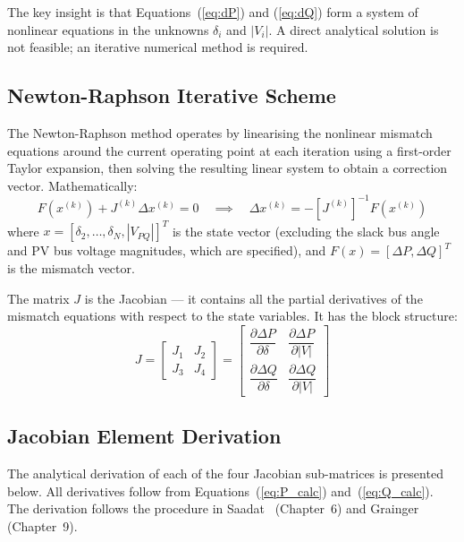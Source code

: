 \documentclass[12pt, a4paper]{article}
\begin{document}
The key insight is that Equations~(\ref{eq:dP}) and (\ref{eq:dQ}) form a system of nonlinear equations in the unknowns $\delta_i$ and $|V_i|$. A direct analytical solution is not feasible; an iterative numerical method is required.

\subsection{Newton-Raphson Iterative Scheme}
The Newton-Raphson method operates by linearising the nonlinear mismatch equations around the current operating point at each iteration using a first-order Taylor expansion, then solving the resulting linear system to obtain a correction vector. Mathematically:
\begin{equation}
F(x^{(k)}) + J^{(k)} \Delta x^{(k)} = 0 \quad \implies \quad \Delta x^{(k)} = -\left[J^{(k)}\right]^{-1} F(x^{(k)})
\label{eq:NR_update}
\end{equation}
where $x = [\delta_2, \ldots, \delta_N, |V_{PQ}|]^T$ is the state vector (excluding the slack bus angle and PV bus voltage magnitudes, which are specified), and $F(x) = [\Delta P, \Delta Q]^T$ is the mismatch vector.

The matrix $J$ is the Jacobian --- it contains all the partial derivatives of the mismatch equations with respect to the state variables. It has the block structure:
\begin{equation}
J = \begin{bmatrix}
J_1 & J_2 \\
J_3 & J_4
\end{bmatrix}
= \begin{bmatrix}
\dfrac{\partial \Delta P}{\partial \delta} & \dfrac{\partial \Delta P}{\partial |V|} \\[8pt]
\dfrac{\partial \Delta Q}{\partial \delta} & \dfrac{\partial \Delta Q}{\partial |V|}
\end{bmatrix}
\label{eq:jacobian_structure}
\end{equation}

\subsection{Jacobian Element Derivation}
The analytical derivation of each of the four Jacobian sub-matrices is presented below. All derivatives follow from Equations~(\ref{eq:P_calc}) and~(\ref{eq:Q_calc}). The derivation follows the procedure in Saadat~\cite{saadat} (Chapter~6) and Grainger~\cite{grainger} (Chapter~9).
\end{document}
